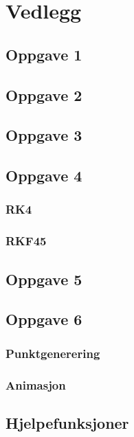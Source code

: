 \section{Vedlegg}
\subsection{Oppgave 1}
\label{kode:oppgave1}

\newpage
\subsection{Oppgave 2}
\label{kode:oppgave2}

\newpage
\subsection{Oppgave 3}
\label{kode:oppgave3}

\newpage
\subsection{Oppgave 4}
\label{kode:oppgave4}
\subsubsection{RK4}
\label{kode:RK4}

\newpage
\subsubsection{RKF45}
\label{kode:RK45}

\newpage
\subsection{Oppgave 5}
\label{kode:oppgave5}

\newpage
\subsection{Oppgave 6}
\label{kode:oppgave6}
\subsubsection{Punktgenerering}

\newpage
\subsubsection{Animasjon}

\newpage
\subsection{Hjelpefunksjoner}
\label{kode:utils}
